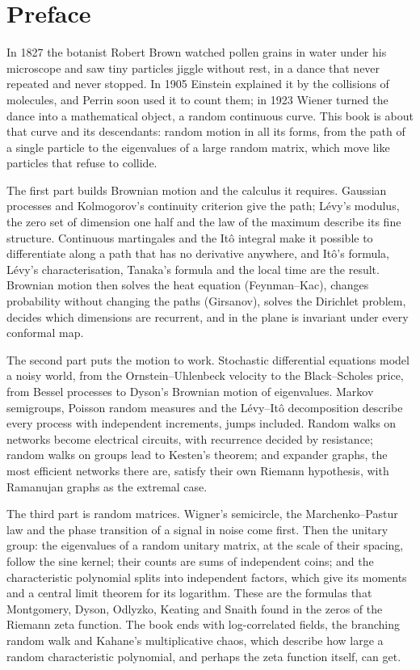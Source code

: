 \chapter*{Preface}
In 1827 the botanist Robert Brown watched pollen grains in water under his microscope and saw tiny particles jiggle without
rest, in a dance that never repeated and never stopped. In 1905 Einstein explained it by the collisions of molecules, and
Perrin soon used it to count them; in 1923 Wiener turned the dance into a mathematical object, a random continuous curve. This book is about that curve and its descendants: random motion in all its forms, from the path of a
single particle to the eigenvalues of a large random matrix, which move like particles that refuse to collide.

The first part builds Brownian motion and the calculus it requires. Gaussian processes and Kolmogorov's continuity criterion
give the path; L\'evy's modulus, the zero set of dimension one half and the law of the maximum describe its fine structure.
Continuous martingales and the It\^o integral make it possible to differentiate along a path that has no derivative anywhere,
and It\^o's formula, L\'evy's characterisation, Tanaka's formula and the local time are the result. Brownian motion then
solves the heat equation (Feynman--Kac), changes probability without changing the paths (Girsanov), solves the Dirichlet
problem, decides which dimensions are recurrent, and in the plane is invariant under every conformal map.

The second part puts the motion to work. Stochastic differential equations model a noisy world, from the Ornstein--Uhlenbeck
velocity to the Black--Scholes price, from Bessel processes to Dyson's Brownian motion of eigenvalues. Markov semigroups,
Poisson random measures and the L\'evy--It\^o decomposition describe every process with independent increments, jumps
included. Random walks on networks become electrical circuits, with recurrence decided by resistance; random walks on groups
lead to Kesten's theorem; and expander graphs, the most efficient networks there are, satisfy their own Riemann hypothesis,
with Ramanujan graphs as the extremal case.

The third part is random matrices. Wigner's semicircle, the Marchenko--Pastur law and the phase transition of a signal in
noise come first. Then the unitary group: the eigenvalues of a random unitary matrix, at the scale of their spacing, follow the
sine kernel; their counts are sums of independent coins; and the characteristic polynomial splits into independent factors,
which give its moments and a central limit theorem for its logarithm. These are the formulas that Montgomery, Dyson, Odlyzko,
Keating and Snaith found in the zeros of the Riemann zeta function. The book ends with log-correlated fields, the branching random walk and Kahane's
multiplicative chaos, which describe how large a random characteristic polynomial, and perhaps the zeta function itself,
can get.


